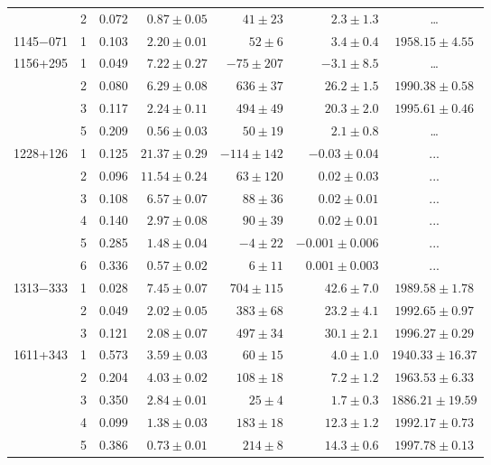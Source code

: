 \begin{table}
\begin{SingleSpace}
\begin{tabular}{l c r r r r c}
         &  2 &  0.072 & $ 0.87\pm 0.05$ & $  41\pm  23$ & $  2.3\pm 1.3$ & \dots \\
1145$-$071 &  1 &  0.103 & $ 2.20\pm 0.01$ & $  52\pm   6$ & $  3.4\pm 0.4$ & $1958.15\pm   4.55$ \\
1156+295 &  1 &  0.049 & $ 7.22\pm 0.27$ & $ -75\pm 207$ & $ -3.1\pm 8.5$ & \dots \\
         &  2 &  0.080 & $ 6.29\pm 0.08$ & $ 636\pm  37$ & $ 26.2\pm 1.5$ & $1990.38\pm   0.58$ \\
         &  3 &  0.117 & $ 2.24\pm 0.11$ & $ 494\pm  49$ & $ 20.3\pm 2.0$ & $1995.61\pm   0.46$ \\
         &  5 &  0.209 & $ 0.56\pm 0.03$ & $  50\pm  19$ & $  2.1\pm 0.8$ & \dots \\
1228+126 &  1 &  0.125 & $21.37\pm 0.29$ & $-114\pm 142$ & $ -0.03\pm 0.04$ &  ... \\
         &  2 &  0.096 & $11.54\pm 0.24$ & $  63\pm 120$ & $  0.02\pm 0.03$ & ... \\
         &  3 &  0.108 & $ 6.57\pm 0.07$ & $  88\pm  36$ & $  0.02\pm 0.01$ & ... \\
         &  4 &  0.140 & $ 2.97\pm 0.08$ & $  90\pm  39$ & $  0.02\pm 0.01$ & ... \\
         &  5 &  0.285 & $ 1.48\pm 0.04$ & $  -4\pm  22$ & $ -0.001\pm 0.006$ &  ... \\
         &  6 &  0.336 & $ 0.57\pm 0.02$ & $   6\pm  11$ & $  0.001\pm 0.003$ &  ... \\
1313$-$333 &  1 &  0.028 & $ 7.45\pm 0.07$ & $ 704\pm 115$ & $ 42.6\pm 7.0$ & $1989.58\pm   1.78$ \\
         &  2 &  0.049 & $ 2.02\pm 0.05$ & $ 383\pm  68$ & $ 23.2\pm 4.1$ & $1992.65\pm   0.97$ \\
         &  3 &  0.121 & $ 2.08\pm 0.07$ & $ 497\pm  34$ & $ 30.1\pm 2.1$ & $1996.27\pm   0.29$ \\
1611+343 &  1 &  0.573 & $ 3.59\pm 0.03$ & $  60\pm  15$ & $  4.0\pm 1.0$ & $1940.33\pm  16.37$ \\
         &  2 &  0.204 & $ 4.03\pm 0.02$ & $ 108\pm  18$ & $  7.2\pm 1.2$ & $1963.53\pm   6.33$ \\
         &  3 &  0.350 & $ 2.84\pm 0.01$ & $  25\pm   4$ & $  1.7\pm 0.3$ & $1886.21\pm  19.59$ \\
         &  4 &  0.099 & $ 1.38\pm 0.03$ & $ 183\pm  18$ & $ 12.3\pm 1.2$ & $1992.17\pm   0.73$ \\
         &  5 &  0.386 & $ 0.73\pm 0.01$ & $ 214\pm   8$ & $ 14.3\pm 0.6$ & $1997.78\pm   0.13$ \\

\end{tabular}
\end{SingleSpace}
\end{table}
